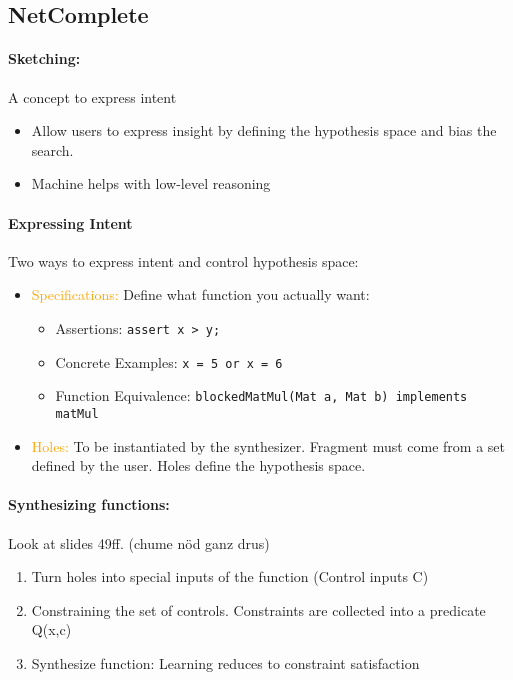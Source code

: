 \subsection{NetComplete}
\paragraph{Sketching: } A concept to express intent
\begin{itemize}
    \item Allow users to express insight by defining the hypothesis space and bias the search.
    \item Machine helps with low-level reasoning
\end{itemize}

\paragraph{Expressing Intent}Two ways to express intent and control hypothesis space:
\begin{itemize}
    \item \textcolor{orange}{Specifications: }Define what function you actually want:
    \begin{itemize}
        \item Assertions: \texttt{assert x > y;}
        \item Concrete Examples: \texttt{x = 5 or x = 6}
        \item Function Equivalence: \texttt{blockedMatMul(Mat a, Mat b) implements matMul}
    \end{itemize}
    \item \textcolor{orange}{Holes: }To be instantiated by the synthesizer. Fragment must come from a set defined by the user. Holes define the hypothesis space.\\
    
    \begin{minipage}{\linewidth}
    \centering      
    \def\svgwidth{\linewidth}
        
    \end{minipage}

\end{itemize}

\paragraph{Synthesizing functions: } Look at slides 49ff. (chume nöd ganz drus)
\begin{enumerate}
    \item Turn holes into special inputs of the function (Control inputs C)
    \item Constraining the set of controls. Constraints are collected into a predicate Q(x,c)
    \item Synthesize function: Learning reduces to constraint satisfaction
\end{enumerate}

